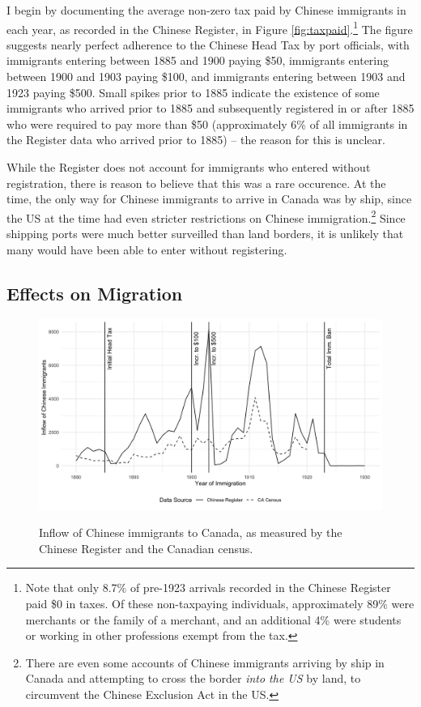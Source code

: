 \documentclass[12pt]{article}
\begin{document}
I begin by documenting the average non-zero tax paid by Chinese immigrants in each year, as recorded in the Chinese Register, in Figure \ref{fig:taxpaid}.\footnote{Note that only 8.7\% of pre-1923 arrivals recorded in the Chinese Register paid \$0 in taxes. Of these non-taxpaying individuals, approximately 89\% were merchants or the family of a merchant, and an additional 4\% were students or working in other professions exempt from the tax.} The figure suggests nearly perfect adherence to the Chinese Head Tax by port officials, with immigrants entering between 1885 and 1900 paying \$50, immigrants entering between 1900 and 1903 paying \$100, and immigrants entering between 1903 and 1923 paying \$500. Small spikes prior to 1885 indicate the existence of some immigrants who arrived prior to 1885 and subsequently registered in or after 1885 who were required to pay more than \$50 (approximately 6\% of all immigrants in the Register data who arrived prior to 1885) -- the reason for this is unclear. 

While the Register does not account for immigrants who entered without registration, there is reason to believe that this was a rare occurence. At the time, the only way for Chinese immigrants to arrive in Canada was by ship, since the US at the time had even stricter restrictions on Chinese immigration.\footnote{There are even some accounts of Chinese immigrants arriving by ship in Canada and attempting to cross the border \textit{into the US }by land, to circumvent the Chinese Exclusion Act in the US.} Since shipping ports were much better surveilled than land borders, it is unlikely that many would have been able to enter without registering. 


\subsection{Effects on Migration}

\begin{figure}
    \centering 
    \caption{Inflow of Chinese immigrants to Canada, as measured by the Chinese Register and the Canadian census.}
    \includegraphics[width=\textwidth]{../../figs/shortpaper_figs/fig2_flow.png}
    \label{fig:inflow}
\end{figure}
\end{document}
